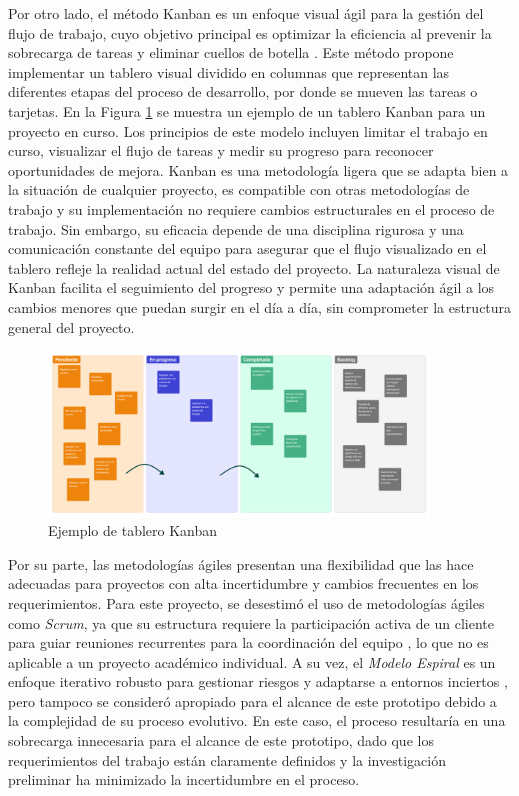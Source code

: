 Por otro lado, el método Kanban es un enfoque visual ágil para la gestión del flujo de trabajo, cuyo objetivo principal es optimizar la eficiencia al prevenir la sobrecarga de tareas y eliminar cuellos de botella \cite{alaidaros2021kanban}. Este método propone implementar un tablero visual dividido en columnas que representan las diferentes etapas del proceso de desarrollo, por donde se mueven las tareas o tarjetas. En la Figura \ref{fig:kanban-board} se muestra un ejemplo de un tablero Kanban para un proyecto en curso. Los principios de este modelo incluyen limitar el trabajo en curso, visualizar el flujo de tareas y medir su progreso para reconocer oportunidades de mejora. Kanban es una metodología ligera que se adapta bien a la situación de cualquier proyecto, es compatible con otras metodologías de trabajo y su implementación no requiere cambios estructurales en el proceso de trabajo. Sin embargo, su eficacia depende de una disciplina rigurosa y una comunicación constante del equipo para asegurar que el flujo visualizado en el tablero refleje la realidad actual del estado del proyecto. La naturaleza visual de Kanban facilita el seguimiento del progreso y permite una adaptación ágil a los cambios menores que puedan surgir en el día a día, sin comprometer la estructura general del proyecto.

\begin{figure}[!htb]
    \centering
    \includegraphics[width=0.9\textwidth]{Figures/model-kanban.png}
    \caption[Tablero Kanban]{Ejemplo de tablero Kanban}
    \label{fig:kanban-board}
\end{figure}

Por su parte, las metodologías ágiles presentan una flexibilidad que las hace adecuadas para proyectos con alta incertidumbre y cambios frecuentes en los requerimientos. Para este proyecto, se desestimó el uso de metodologías ágiles como \textit{Scrum}, ya que su estructura requiere la participación activa de un cliente para guiar reuniones recurrentes para la coordinación del equipo \cite{pressman2010ingenieria}, lo que no es aplicable a un proyecto académico individual. A su vez, el \textit{Modelo Espiral} es un enfoque iterativo robusto para gestionar riesgos y adaptarse a entornos inciertos \cite{pressman2010ingenieria}, pero tampoco se consideró apropiado para el alcance de este prototipo debido a la complejidad de su proceso evolutivo. En este caso, el proceso resultaría en una sobrecarga innecesaria para el alcance de este prototipo, dado que los requerimientos del trabajo están claramente definidos y la investigación preliminar ha minimizado la incertidumbre en el proceso.

